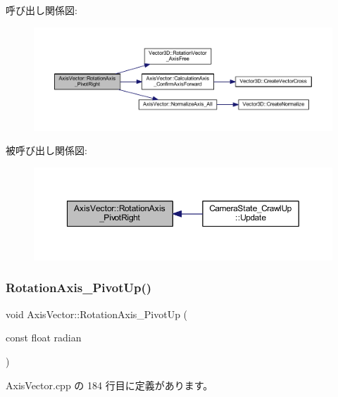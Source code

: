 呼び出し関係図\+:
\nopagebreak
\begin{figure}[H]
\begin{center}
\leavevmode
\includegraphics[width=350pt]{class_axis_vector_a71a7638817a488d824cdc757d4e28a0c_cgraph}
\end{center}
\end{figure}
被呼び出し関係図\+:
\nopagebreak
\begin{figure}[H]
\begin{center}
\leavevmode
\includegraphics[width=350pt]{class_axis_vector_a71a7638817a488d824cdc757d4e28a0c_icgraph}
\end{center}
\end{figure}
\mbox{\label{class_axis_vector_ad33eef7f1b3912b6a1d0eaa18fff8f29}} 
\subsubsection{\texorpdfstring{Rotation\+Axis\+\_\+\+Pivot\+Up()}{RotationAxis\_PivotUp()}}
{\footnotesize\ttfamily void Axis\+Vector\+::\+Rotation\+Axis\+\_\+\+Pivot\+Up (\begin{DoxyParamCaption}\item[{const float}]{radian }\end{DoxyParamCaption})}



 Axis\+Vector.\+cpp の 184 行目に定義があります。

